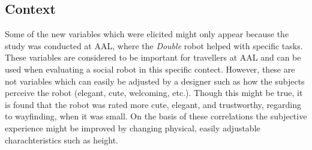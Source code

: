 \subsection{Context}
%
 Some of the new variables which were elicited might only appear because the study was conducted at AAL, where the \textit{Double} robot helped with specific tasks. These variables are considered to be important for travellers at AAL and can be used when evaluating a social robot in this specific contect. However, these are not variables which can easily be adjusted by a designer such as how the subjects perceive the robot (elegant, cute, welcoming, etc.). Though this might be true, it is found that the robot was rated more cute, elegant, and trustworthy, regarding to wayfinding, when it was small. On the basis of these correlations the subjective experience might be improved by changing physical, easily adjustable charachteristics such as height.

 

